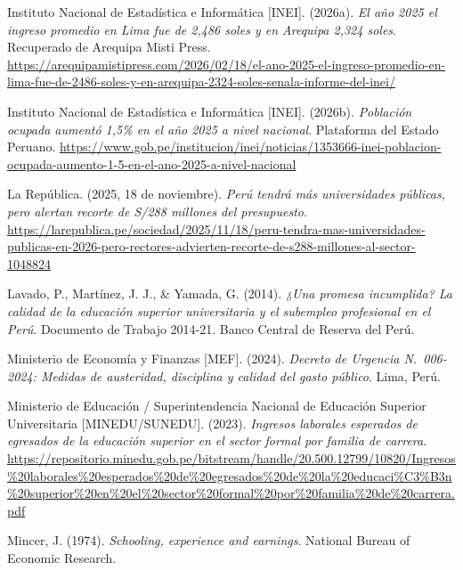 \documentclass[11pt, a4paper]{article}
\begin{document}
\vspace{0.2cm}
\noindent\hangindent=1.27cm
Instituto Nacional de Estadística e Informática [INEI]. (2026a). \textit{El año 2025 el ingreso promedio en Lima fue de 2,486 soles y en Arequipa 2,324 soles}. Recuperado de Arequipa Misti Press. \url{https://arequipamistipress.com/2026/02/18/el-ano-2025-el-ingreso-promedio-en-lima-fue-de-2486-soles-y-en-arequipa-2324-soles-senala-informe-del-inei/}

\vspace{0.2cm}
\noindent\hangindent=1.27cm
Instituto Nacional de Estadística e Informática [INEI]. (2026b). \textit{Población ocupada aumentó 1,5\% en el año 2025 a nivel nacional}. Plataforma del Estado Peruano. \url{https://www.gob.pe/institucion/inei/noticias/1353666-inei-poblacion-ocupada-aumento-1-5-en-el-ano-2025-a-nivel-nacional}

\vspace{0.2cm}
\noindent\hangindent=1.27cm
La República. (2025, 18 de noviembre). \textit{Perú tendrá más universidades públicas, pero alertan recorte de S/288 millones del presupuesto}. \url{https://larepublica.pe/sociedad/2025/11/18/peru-tendra-mas-universidades-publicas-en-2026-pero-rectores-advierten-recorte-de-s288-millones-al-sector-1048824}

\vspace{0.2cm}
\noindent\hangindent=1.27cm
Lavado, P., Martínez, J. J., \& Yamada, G. (2014). \textit{¿Una promesa incumplida? La calidad de la educación superior universitaria y el subempleo profesional en el Perú}. Documento de Trabajo 2014-21. Banco Central de Reserva del Perú.

\vspace{0.2cm}
\noindent\hangindent=1.27cm
Ministerio de Economía y Finanzas [MEF]. (2024). \textit{Decreto de Urgencia N.\textdegree~006-2024: Medidas de austeridad, disciplina y calidad del gasto público}. Lima, Perú.

\vspace{0.2cm}
\noindent\hangindent=1.27cm
Ministerio de Educación / Superintendencia Nacional de Educación Superior Universitaria [MINEDU/SUNEDU]. (2023). \textit{Ingresos laborales esperados de egresados de la educación superior en el sector formal por familia de carrera}. \url{https://repositorio.minedu.gob.pe/bitstream/handle/20.500.12799/10820/Ingresos\%20laborales\%20esperados\%20de\%20egresados\%20de\%20la\%20educaci\%C3\%B3n\%20superior\%20en\%20el\%20sector\%20formal\%20por\%20familia\%20de\%20carrera.pdf}

\vspace{0.2cm}
\noindent\hangindent=1.27cm
Mincer, J. (1974). \textit{Schooling, experience and earnings}. National Bureau of Economic Research.
\end{document}
